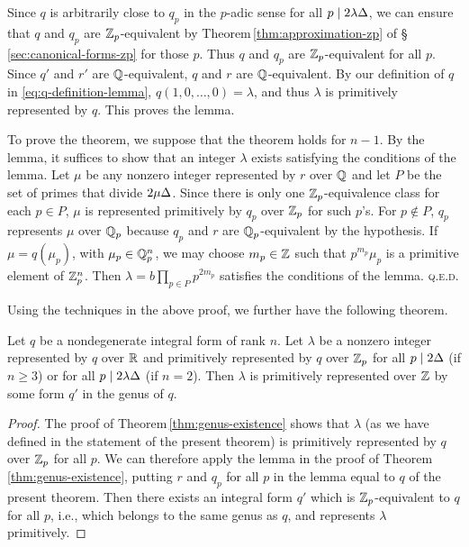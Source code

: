 Since \(q\) is arbitrarily close to \(q_p\) in the \(p\)-adic sense for all \(p
\mid 2 \lambda {\Delta}\), we can ensure that \(q\) and \(q_p\) are
\(\mathbb{Z}_p\)-equivalent by Theorem\,\ref{thm:approximation-zp} of
\S\,\ref{sec:canonical-forms-zp} for those \(p\). Thus \(q\) and \(q_p\) are
\(\mathbb{Z}_p\)-equivalent for all \(p\). Since \(q'\) and \(r'\) are
\(\mathbb{Q}\)-equivalent, \(q\) and \(r\) are \(\mathbb{Q}\)-equivalent. By our
definition of \(q\) in \eqref{eq:q-definition-lemma}, \(q(1,0,\dots, 0) =
\lambda\), and thus \(\lambda\) is primitively represented by \(q\). This proves
the lemma.

\medskip

To prove the theorem, we suppose that the theorem holds for \(n - 1\). By the
lemma, it suffices to show that an integer \(\lambda\) exists satisfying the
conditions of the lemma. Let \(\mu\) be any nonzero integer represented by \(r\)
over \(\mathbb{Q}\) and let \(P\) be the set of primes that divide
\(2\mu{\Delta}\). Since there is only one \(\mathbb{Z}_p\)-equivalence class for
each \(p \in P\), \(\mu\) is represented primitively by \(q_p\) over
\(\mathbb{Z}_p\) for such \(p\)'s. For \(p \notin P\), \(q_p\) represents \(\mu\)
over \(\mathbb{Q}_p\) because \(q_p\) and \(r\) are \(\mathbb{Q}_p\)-equivalent
by the hypothesis. If \(\mu = q(\mu_p)\), with \(\mu_p \in \mathbb{Q}_p^n\), we
may choose \(m_p \in \mathbb{Z}\) such that \(p^{m_p}\mu_p\) is a primitive
element of \(\mathbb{Z}_p^n\). Then \(\lambda = b \prod_{p \in P} p^{2m_p}\)
satisfies the conditions of the lemma. {\scshape q.e.d.}

\medskip

Using the techniques in the above proof, we further have the following theorem.

\begin{theoremx}\label{thm:genus-existence-2} {\normalfont
    \cite[p.\,143]{cassels2008rational}} Let \(q\) be a nondegenerate integral
    form of rank \(n\). Let \(\lambda\) be a nonzero integer represented by
    \(q\) over \(\mathbb{R}\) and primitively represented by \(q\) over
    \(\mathbb{Z}_p\) for all \(p \mid 2{\Delta}\) (if \(n \geq 3\)) or for all \(p
    \mid 2\lambda{\Delta}\) (if \(n = 2\)). Then \(\lambda\) is primitively
    represented  over \(\mathbb{Z}\) by some form \(q'\) in the genus of \(q\).
\end{theoremx}

\begin{proof}
    The proof of Theorem\,\ref{thm:genus-existence} shows that \(\lambda\) (as
    we have defined in the statement of the present theorem) is primitively
    represented by \(q\) over \(\mathbb{Z}_p\) for all \(p\). We can therefore
    apply the lemma in the proof of Theorem\,\ref{thm:genus-existence}, putting
    \(r\) and \(q_p\) for all \(p\) in the lemma equal to \(q\) of the present
    theorem. Then there exists an integral form \(q'\) which is
    \(\mathbb{Z}_p\)-equivalent to \(q\) for all \(p\), i.e., which belongs to
    the same genus as \(q\), and represents \(\lambda\) primitively.
\end{proof}

